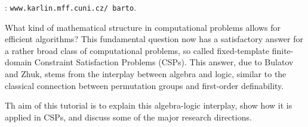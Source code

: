 \documentclass[bsl,meeting]{asl}
\def\urladdr#1{\endgraf\noindent{\it URL Address}: {\tt #1}.}
\newcommand{\NP}{}
\begin{document}
\thispagestyle{empty}


\NP%
%
%
%
%
\urladdr{www.karlin.mff.cuni.cz/\string~barto}


What kind of mathematical structure in computational problems allows for efficient algorithms? This fundamental question now has a satisfactory answer for a rather broad class of computational problems, so called fixed-template finite-domain Constraint Satisfaction Problems (CSPs). This answer, due to Bulatov and Zhuk, stems from the interplay between algebra and logic, similar to the classical connection between permutation groups and first-order definability. 

Th aim of this tutorial is to explain this algebra-logic interplay, show how it is applied in CSPs, and discuss some of the major research directions.
\end{document}
